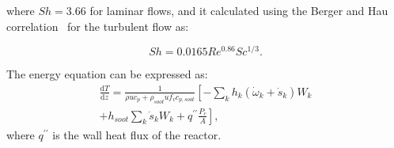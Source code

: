 \noindent where $Sh=3.66$ for laminar flows, and it calculated using the Berger and Hau correlation~\citep{berger1977mass} for the turbulent flow as:

\begin{equation}
	Sh=
	0.0165Re^{0.86} Sc^{1/3}
	\label{eqn:shdep}.
\end{equation}

The energy equation can be expressed as:
\begin{equation}
	\begin{split}
		\frac{\mathrm{d} T}{\mathrm{d} z}=
		\frac{1}{\rho u c_p+\rho_{soot} u f_v 	c_{p,soot}}
		\left[
		-\sum_k h_k
		\left(
		\dot{\omega}_k+\dot{s}_k
		\right) W_k
		\right. \\
		\left.
		+h_{soot}\sum_k \dot{s}_k W_k
		+q^{\prime \prime}\frac{P_c}{A}
		\right],
	\end{split}
	\label{eqn:energypfr}
\end{equation}
\noindent where $q^{\prime \prime}$ is the wall heat flux of the reactor.
